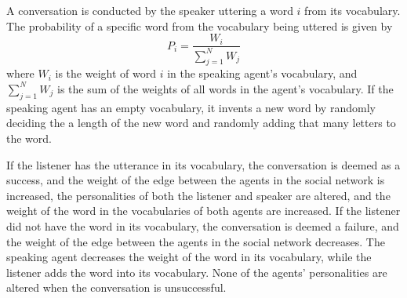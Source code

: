 A conversation is conducted by the speaker uttering a word $i$ from its vocabulary. The probability of a specific word from the vocabulary being uttered is given by
\begin{equation}\label{eq:chooseWordprob}
P_{i} = \frac{W_{i}}{\sum_{j=1}^{N}W_{j}}
\end{equation}
where $W_{i}$ is the weight of word $i$ in the speaking agent's vocabulary, and $\sum_{j=1}^{N}W_{j}$ is the sum of the weights of all words in the agent's vocabulary. If the speaking agent has an empty vocabulary, it invents a new word by randomly deciding the a length of the new word and randomly adding that many letters to the word. 

If the listener has the utterance in its vocabulary, the conversation is deemed as a success, and the weight of the edge between the agents in the social network is increased, the personalities of both the listener and speaker are altered, and the weight of the word in the vocabularies of both agents are increased. If the listener did not have the word in its vocabulary, the conversation is deemed a failure, and the weight of the edge between the agents in the social network decreases. The speaking agent decreases the weight of the word in its vocabulary, while the listener adds the word into its vocabulary. None of the agents' personalities are altered when the conversation is unsuccessful.

